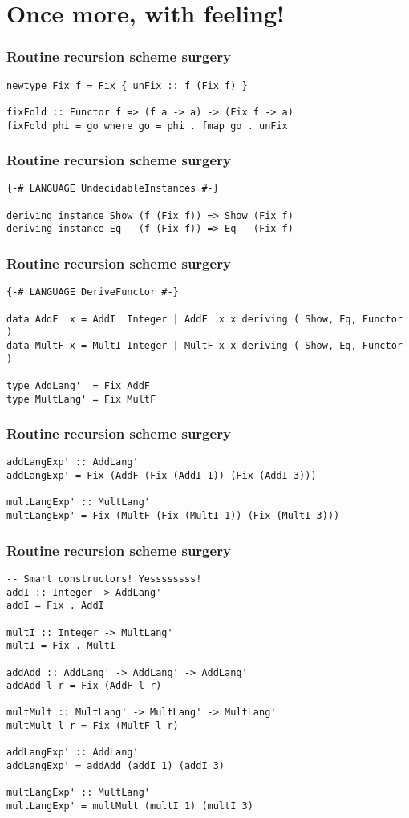 \documentclass[pdf]{beamer}
\begin{document}
\section{Once more, with feeling!}

\begin{frame}[fragile]
  \frametitle{Routine recursion scheme surgery}
\begin{lstlisting}[p]
newtype Fix f = Fix { unFix :: f (Fix f) }

fixFold :: Functor f => (f a -> a) -> (Fix f -> a)
fixFold phi = go where go = phi . fmap go . unFix
\end{lstlisting}
\end{frame}

\begin{frame}[fragile]
  \frametitle{Routine recursion scheme surgery}
\begin{lstlisting}
{-# LANGUAGE UndecidableInstances #-}

deriving instance Show (f (Fix f)) => Show (Fix f)
deriving instance Eq   (f (Fix f)) => Eq   (Fix f)
\end{lstlisting}
\end{frame}

\begin{frame}[fragile]
  \frametitle{Routine recursion scheme surgery}
\begin{lstlisting}
{-# LANGUAGE DeriveFunctor #-}

data AddF  x = AddI  Integer | AddF  x x deriving ( Show, Eq, Functor )
data MultF x = MultI Integer | MultF x x deriving ( Show, Eq, Functor )

type AddLang'  = Fix AddF
type MultLang' = Fix MultF
\end{lstlisting}
\end{frame}

\begin{frame}[fragile]
  \frametitle{Routine recursion scheme surgery}
\begin{lstlisting}
addLangExp' :: AddLang'
addLangExp' = Fix (AddF (Fix (AddI 1)) (Fix (AddI 3)))

multLangExp' :: MultLang'
multLangExp' = Fix (MultF (Fix (MultI 1)) (Fix (MultI 3)))
\end{lstlisting}
\end{frame}

\begin{frame}[fragile]
  \frametitle{Routine recursion scheme surgery}
\begin{lstlisting}
-- Smart constructors! Yessssssss!
addI :: Integer -> AddLang'
addI = Fix . AddI

multI :: Integer -> MultLang'
multI = Fix . MultI

addAdd :: AddLang' -> AddLang' -> AddLang'
addAdd l r = Fix (AddF l r)

multMult :: MultLang' -> MultLang' -> MultLang'
multMult l r = Fix (MultF l r)

addLangExp' :: AddLang'
addLangExp' = addAdd (addI 1) (addI 3)

multLangExp' :: MultLang'
multLangExp' = multMult (multI 1) (multI 3)
\end{lstlisting}
\end{frame}
\end{document}
